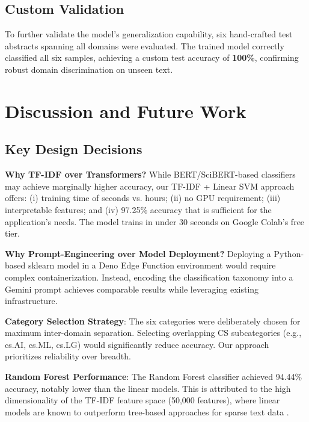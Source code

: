 \documentclass[conference]{IEEEtran}
\begin{document}
\subsection{Custom Validation}

To further validate the model's generalization capability, six hand-crafted test abstracts spanning all domains were evaluated. The trained model correctly classified all six samples, achieving a custom test accuracy of \textbf{100\%}, confirming robust domain discrimination on unseen text.

\section{Discussion and Future Work}

\subsection{Key Design Decisions}

\textbf{Why TF-IDF over Transformers?} While BERT/SciBERT-based classifiers may achieve marginally higher accuracy, our TF-IDF + Linear SVM approach offers: (i) training time of seconds vs. hours; (ii) no GPU requirement; (iii) interpretable features; and (iv) 97.25\% accuracy that is sufficient for the application's needs. The model trains in under 30 seconds on Google Colab's free tier.

\textbf{Why Prompt-Engineering over Model Deployment?} Deploying a Python-based sklearn model in a Deno Edge Function environment would require complex containerization. Instead, encoding the classification taxonomy into a Gemini prompt achieves comparable results while leveraging existing infrastructure.

\textbf{Category Selection Strategy}: The six categories were deliberately chosen for maximum inter-domain separation. Selecting overlapping CS subcategories (e.g., cs.AI, cs.ML, cs.LG) would significantly reduce accuracy. Our approach prioritizes reliability over breadth.

\textbf{Random Forest Performance}: The Random Forest classifier achieved 94.44\% accuracy, notably lower than the linear models. This is attributed to the high dimensionality of the TF-IDF feature space (50,000 features), where linear models are known to outperform tree-based approaches for sparse text data \cite{joachims_text}.
\end{document}
